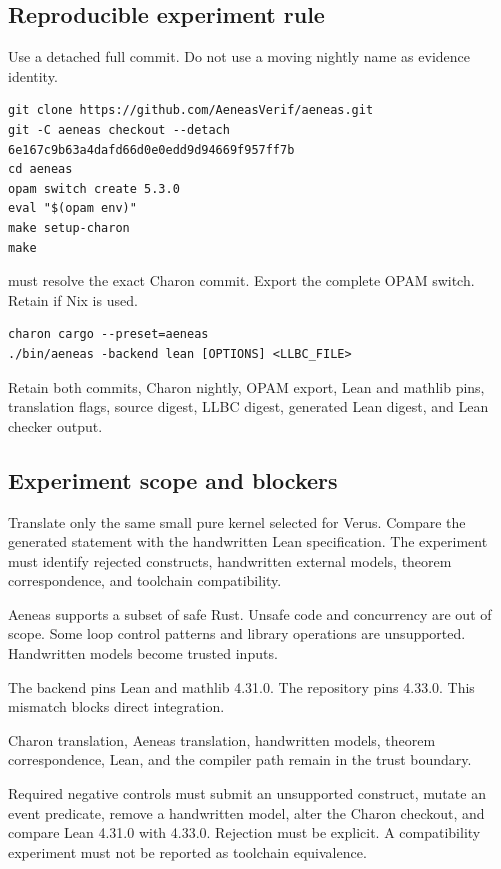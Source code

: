 \documentclass[11pt]{article}
\begin{document}
\subsection{Reproducible experiment rule}

Use a detached full commit.  Do not use a moving nightly name as evidence identity.

\begin{lstlisting}
git clone https://github.com/AeneasVerif/aeneas.git
git -C aeneas checkout --detach 6e167c9b63a4dafd66d0e0edd9d94669f957ff7b
cd aeneas
opam switch create 5.3.0
eval "$(opam env)"
make setup-charon
make
\end{lstlisting}

 must resolve the exact Charon commit.  Export the complete OPAM switch.
Retain  if Nix is used.

\begin{lstlisting}
charon cargo --preset=aeneas
./bin/aeneas -backend lean [OPTIONS] <LLBC_FILE>
\end{lstlisting}

Retain both commits, Charon nightly, OPAM export, Lean and mathlib pins, translation flags, source
digest, LLBC digest, generated Lean digest, and Lean checker output.

\subsection{Experiment scope and blockers}

Translate only the same small pure kernel selected for Verus.  Compare the generated statement
with the handwritten Lean specification.  The experiment must identify rejected constructs,
handwritten external models, theorem correspondence, and toolchain compatibility.

Aeneas supports a subset of safe Rust.  Unsafe code and concurrency are out of scope.  Some loop
control patterns and library operations are unsupported.  Handwritten models become trusted
inputs.

The backend pins Lean and mathlib 4.31.0.  The repository pins 4.33.0.  This mismatch blocks direct
integration.

Charon translation, Aeneas translation, handwritten models, theorem correspondence, Lean, and the
compiler path remain in the trust boundary.

Required negative controls must submit an unsupported construct, mutate an event predicate, remove
a handwritten model, alter the Charon checkout, and compare Lean 4.31.0 with 4.33.0.  Rejection
must be explicit.  A compatibility experiment must not be reported as toolchain equivalence.
\end{document}

